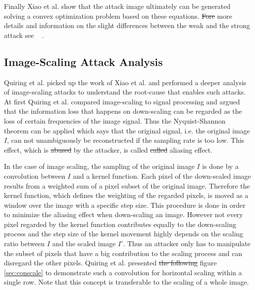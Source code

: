 \documentclass[sigconf]{acmart}
\providecommand{\DIFadd}[1]{{\protect\color{blue}\uwave{#1}}} %
\providecommand{\DIFdel}[1]{{\protect\color{red}\sout{#1}}}                      %
\providecommand{\DIFaddbegin}{} %
\providecommand{\DIFaddend}{} %
\providecommand{\DIFdelbegin}{} %
\providecommand{\DIFdelend}{} %
\begin{document}
Finally Xiao et al. show that the attack image ultimately can be generated solving a convex optimization problem based on these equations.
\DIFdelbegin \DIFdel{Fore }\DIFdelend \DIFaddbegin \DIFadd{For }\DIFaddend more details and information on the slight differences between the weak and the strong attack see ~ \cite{camouflage}.

\subsection{Image-Scaling Attack Analysis}
\label{sec:imgscalemethod}
Quiring et al.\cite{imgscale} picked up the work of Xiao et al. and performed a deeper analysis of image-scaling attacks to understand the root-cause that enables such attacks.
At first Quiring et al. compared image-scaling to signal processing and argued that the information loss that happens on down-scaling can be regarded as the loss of certain frequencies of the image signal.
Thus the Nyquist-Shannon theorem \cite{10.5555/1795494} can be applied which says that the original signal, i.e. the original image $I$, can not unambiguously be reconstructed if the sampling rate is too low.
This effect, which is \DIFdelbegin \DIFdel{abused }\DIFdelend \DIFaddbegin \DIFadd{exploited }\DIFaddend by the attacker, is called \DIFdelbegin \DIFdel{called }\DIFdelend aliasing effect.

In the case of image scaling, the sampling of the original image $I$ is done by a convolution between $I$ and a kernel function.
Each pixel of the down-scaled image results from a weighted sum of a pixel subset of the original image.
Therefore the kernel function, which defines the weighting of the regarded pixels, is moved as a window over the image with a specific step size.
This procedure is done in order to minimize the aliasing effect when down-scaling an image.
However not every pixel regarded by the kernel function contributes equally to the down-scaling process and the step size of the kernel movement highly depends on the scaling ratio between $I$ and the scaled image $I'$.
Thus an attacker only has to manipulate the subset of pixels that have a big contribution to the scaling process and can disregard the other pixels.
Quiring et al. presented \DIFdelbegin \DIFdel{the following }\DIFdelend figure \ref{sec:conscale} to demonstrate such a convolution for horizontal scaling within a single row.
Note that this concept is transferable to the scaling of a whole image.
\end{document}
